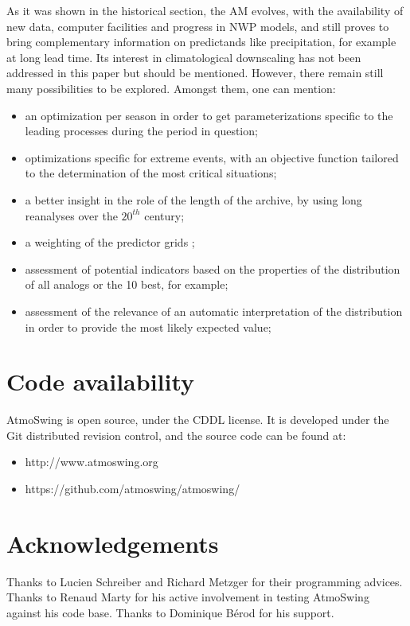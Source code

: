 \documentclass[review]{elsarticle}
\begin{document}
As it was shown in the historical section, the AM evolves, with the availability of new data, computer facilities and progress in NWP models, and still proves to bring complementary information on predictands like precipitation, for example at long lead time. Its interest in climatological downscaling has not been addressed in this paper but should be mentioned. However, there remain still many possibilities to be explored. Amongst them, one can mention:

\begin{itemize}
	\item an optimization per season in order to get parameterizations specific to the leading processes during the period in question;
	\item optimizations specific for extreme events, with an objective function tailored to the determination of the most critical situations;
	\item a better insight in the role of the length of the archive, by using long reanalyses over the $20^{th}$ century;	
	\item a weighting of the predictor grids \citep[see][]{Bliefernicht2010};
	\item assessment of potential indicators based on the properties of the distribution of all analogs or the 10 best, for example;
	\item assessment of the relevance of an automatic interpretation of the distribution in order to provide the most likely expected value;
\end{itemize}


\section*{Code availability}

AtmoSwing is open source, under the CDDL license. It is developed under the Git distributed revision control, and the source code can be found at:

\begin{itemize}
	\item http://www.atmoswing.org
	\item https://github.com/atmoswing/atmoswing/
\end{itemize}


\section*{Acknowledgements}
Thanks to Lucien Schreiber and Richard Metzger for their programming advices. Thanks to Renaud Marty for his active involvement in testing AtmoSwing against his code base. Thanks to Dominique B\'{e}rod for his support.
\end{document}
